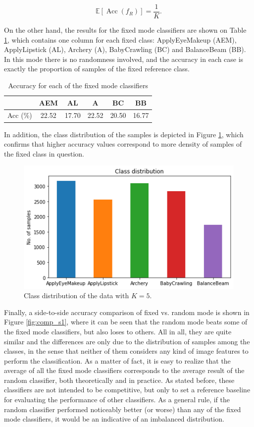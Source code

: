 \documentclass[letterpaper, 10 pt, conference]{IEEEtran}
\begin{document}
\begin{equation}
  \label{eq:expectation}
\mathbb E\left[\operatorname{Acc}(f_R)\right] = \frac{1}{K}.
\end{equation}

On the other hand, the results for the fixed mode classifiers are shown on Table \ref{tab:fixed}, which contains one column for each fixed class: ApplyEyeMakeup (AEM), ApplyLipstick (AL), Archery (A), BabyCrawling (BC) and BalanceBeam (BB). In this mode there is no randomness involved, and the accuracy in each case is exactly the proportion of samples of the fixed reference class.

\begin{table}[h!]
  \centering
  \begin{tabular}{c|ccccc}
    & AEM & AL & A & BC & BB\\
    \hline
    Acc (\%) & 22.52 & 17.70 & 22.52 & 20.50 & 16.77
  \end{tabular}\vspace{1em}
  \caption{Accuracy for each of the fixed mode classifiers}
  \label{tab:fixed}
\end{table}

In addition, the class distribution of the samples is depicted in Figure \ref{fig:class_dist}, which confirms that higher accuracy values correspond to more density of samples of the fixed class in question.

\begin{figure}[h!]
  \centering
  \includegraphics[width=.4\textwidth]{img/s1_class_distribution}
  \vspace{-.5em}
  \caption{Class distribution of the data with $K=5$.}
  \label{fig:class_dist}
\end{figure}

Finally, a side-to-side accuracy comparison of fixed vs. random mode is shown in Figure \ref{fig:comp_s1}, where it can be seen that the random mode beats some of the fixed mode classifiers, but also loses to others. All in all, they are quite similar and the differences are only due to the distribution of samples among the classes, in the sense that neither of them considers any kind of image features to perform the classification. As a matter of fact, it is easy to realize that the average of all the fixed mode classifiers corresponds to the average result of the random classifier, both theoretically and in practice. As stated before, these classifiers are not intended to be competitive, but only to set a reference baseline for evaluating the performance of other classifiers. As a general rule, if the random classifier performed noticeably better (or worse) than any of the fixed mode classifiers, it would be an indicative of an imbalanced distribution.
\end{document}
